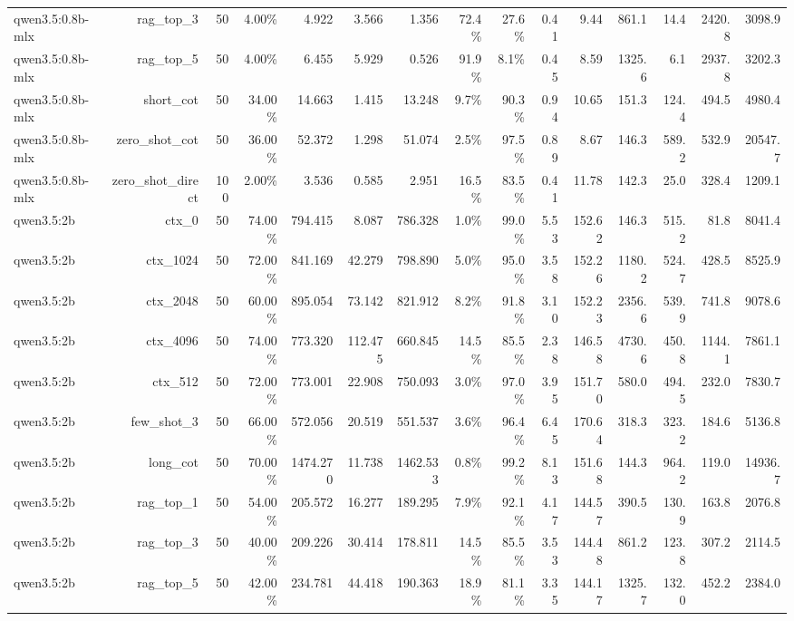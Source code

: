 \begin{table}[t]
\begin{tabular}{lrrrrrrrrrrrrrr}
qwen3.5:0.8b-mlx & rag\_top\_3 & 50 & 4.00\% & 4.922 & 3.566 & 1.356 & 72.4\% & 27.6\% & 0.41 & 9.44 & 861.1 & 14.4 & 2420.8 & 3098.9 \\
qwen3.5:0.8b-mlx & rag\_top\_5 & 50 & 4.00\% & 6.455 & 5.929 & 0.526 & 91.9\% & 8.1\% & 0.45 & 8.59 & 1325.6 & 6.1 & 2937.8 & 3202.3 \\
qwen3.5:0.8b-mlx & short\_cot & 50 & 34.00\% & 14.663 & 1.415 & 13.248 & 9.7\% & 90.3\% & 0.94 & 10.65 & 151.3 & 124.4 & 494.5 & 4980.4 \\
qwen3.5:0.8b-mlx & zero\_shot\_cot & 50 & 36.00\% & 52.372 & 1.298 & 51.074 & 2.5\% & 97.5\% & 0.89 & 8.67 & 146.3 & 589.2 & 532.9 & 20547.7 \\
qwen3.5:0.8b-mlx & zero\_shot\_direct & 100 & 2.00\% & 3.536 & 0.585 & 2.951 & 16.5\% & 83.5\% & 0.41 & 11.78 & 142.3 & 25.0 & 328.4 & 1209.1 \\
qwen3.5:2b & ctx\_0 & 50 & 74.00\% & 794.415 & 8.087 & 786.328 & 1.0\% & 99.0\% & 5.53 & 152.62 & 146.3 & 515.2 & 81.8 & 8041.4 \\
qwen3.5:2b & ctx\_1024 & 50 & 72.00\% & 841.169 & 42.279 & 798.890 & 5.0\% & 95.0\% & 3.58 & 152.26 & 1180.2 & 524.7 & 428.5 & 8525.9 \\
qwen3.5:2b & ctx\_2048 & 50 & 60.00\% & 895.054 & 73.142 & 821.912 & 8.2\% & 91.8\% & 3.10 & 152.23 & 2356.6 & 539.9 & 741.8 & 9078.6 \\
qwen3.5:2b & ctx\_4096 & 50 & 74.00\% & 773.320 & 112.475 & 660.845 & 14.5\% & 85.5\% & 2.38 & 146.58 & 4730.6 & 450.8 & 1144.1 & 7861.1 \\
qwen3.5:2b & ctx\_512 & 50 & 72.00\% & 773.001 & 22.908 & 750.093 & 3.0\% & 97.0\% & 3.95 & 151.70 & 580.0 & 494.5 & 232.0 & 7830.7 \\
qwen3.5:2b & few\_shot\_3 & 50 & 66.00\% & 572.056 & 20.519 & 551.537 & 3.6\% & 96.4\% & 6.45 & 170.64 & 318.3 & 323.2 & 184.6 & 5136.8 \\
qwen3.5:2b & long\_cot & 50 & 70.00\% & 1474.270 & 11.738 & 1462.533 & 0.8\% & 99.2\% & 8.13 & 151.68 & 144.3 & 964.2 & 119.0 & 14936.7 \\
qwen3.5:2b & rag\_top\_1 & 50 & 54.00\% & 205.572 & 16.277 & 189.295 & 7.9\% & 92.1\% & 4.17 & 144.57 & 390.5 & 130.9 & 163.8 & 2076.8 \\
qwen3.5:2b & rag\_top\_3 & 50 & 40.00\% & 209.226 & 30.414 & 178.811 & 14.5\% & 85.5\% & 3.53 & 144.48 & 861.2 & 123.8 & 307.2 & 2114.5 \\
qwen3.5:2b & rag\_top\_5 & 50 & 42.00\% & 234.781 & 44.418 & 190.363 & 18.9\% & 81.1\% & 3.35 & 144.17 & 1325.7 & 132.0 & 452.2 & 2384.0 \\

\end{tabular}
\end{table}
